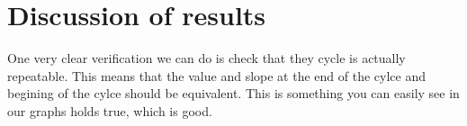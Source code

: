\documentclass[nofoot,pdf-a,balance,colorlinks,upint,subscriptcorrection,varvw,mathalfa=cal=boondoxo]{asmeconf}
\begin{document}
\begin{table}[H]
        \caption[Table]{Max forces at P - Case 1}\label{tab:pForce1}
    \end{table}
\begin{table}[H]
        \caption[Table]{Max forces at P - Case 2}\label{tab:pForce2}
    \end{table}
\begin{table}[H]
        \caption[Table]{Max forces at P - Case 3}\label{tab:pForce3}
    \end{table}

	\section{Discussion of results}
	One very clear verification we can do is check that they cycle is actually repeatable. This means that the value and slope at the end of the cylce and begining of the cylce should be equivalent. This is something you can easily see in our graphs holds true, which is good. 
\end{document}
